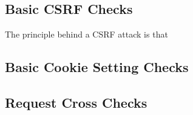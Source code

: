 \subsection{Basic CSRF Checks}

The principle behind a CSRF attack is that 


\subsection{Basic Cookie Setting Checks}

\subsection{Request Cross Checks}



